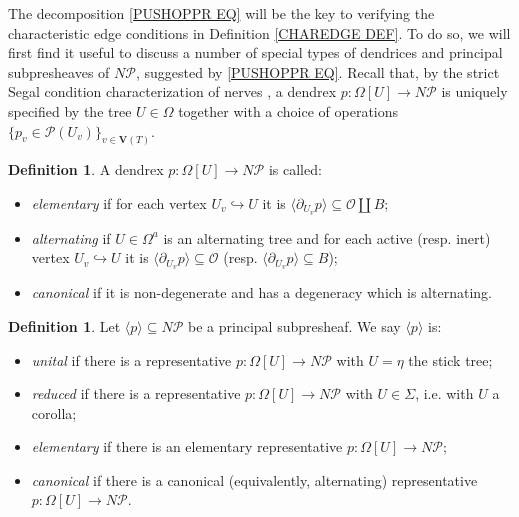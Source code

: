 \documentclass[a4paper,10pt
,draft
]{article}%
\numberwithin{equation}{section}
\numberwithin{figure}{section}
\theoremstyle{definition} %
\newtheorem{definition}[equation]{Definition}%
\renewcommand{\O}{\ensuremath{\mathcal O}}
\newcommand{\1}{\ensuremath{\mathbbm 1}}%
\begin{document}
The decomposition \eqref{PUSHOPPR EQ}
will be the key to verifying the 
characteristic edge conditions in Definition \ref{CHAREDGE DEF}.
To do so, we will first find it useful to discuss a number of special types of dendrices and principal subpresheaves of $N \mathcal{P}$, suggested by \eqref{PUSHOPPR EQ}.
%
Recall that, by the strict Segal condition characterization of nerves \cite[Cor. 2.7]{CM13a},
a dendrex $p \colon \Omega[U] \to N \mathcal{P}$
is uniquely specified by the tree $U \in \Omega$ together with a choice of operations
$\{p_v \in \mathcal{P}(U_v)\}_{v \in \boldsymbol{V}(T)}$.


\begin{definition}
	A dendrex $p\colon \Omega[U] \to N \mathcal{P}$ 
	is called:
	\begin{itemize}
		\item \emph{elementary} if for each vertex $U_v \hookrightarrow U$
		it is $\langle \partial_{U_v} p\rangle \subseteq \mathcal{O} \amalg B$; %
		\item \emph{alternating} if $U \in \Omega^a$ is an alternating tree
		and for each active (resp. inert) vertex 
		$U_v \hookrightarrow U$ it is
		$\langle \partial_{U_v} p \rangle \subseteq \O$
		(resp. $\langle \partial_{U_v} p \rangle \subseteq B$);
		\item \emph{canonical} if it is non-degenerate and has a degeneracy which is alternating.
	\end{itemize}
\end{definition}


\begin{definition}
	Let $\langle p \rangle \subseteq N \mathcal{P}$ be 
	a principal subpresheaf. 
	We say $\langle p \rangle$ is:
	\begin{itemize}
		\item \emph{unital} if there is a representative
		$p\colon \Omega[U] \to N \mathcal{P}$ with $U=\eta$ the stick tree;
		\item \emph{reduced} if there is a representative
		$p\colon \Omega[U] \to N \mathcal{P}$ with $U \in \Sigma$, i.e. with $U$ a corolla;
		\item \emph{elementary} 
		if there is an elementary representative
		$p\colon \Omega[U] \to N \mathcal{P}$;
		\item \emph{canonical} 
		if there is a canonical (equivalently, alternating) representative
		$p\colon \Omega[U] \to N \mathcal{P}$.
	\end{itemize}
\end{definition}
\end{document}
